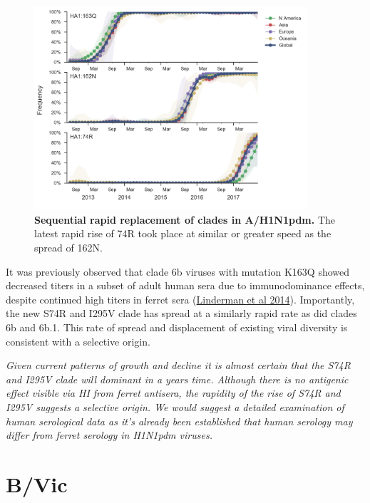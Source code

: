 \documentclass[11pt,oneside,letterpaper]{article}
\begin{document}
\begin{figure}[H]
  \centering
  \includegraphics[width=0.9\textwidth]{../figures/sep-2017/h1n1pdm_mutations_6b_6b1.png}
  \caption{\textbf{Sequential rapid replacement of clades in A/H1N1pdm.} The latest rapid rise of 74R took place at similar or greater speed as the spread of 162N.
  }
  \label{H1N1pdm_mutations}
\end{figure}
It was previously observed that clade 6b viruses with mutation K163Q
showed decreased titers in a subset of adult human sera due to
immunodominance effects, despite continued high titers in ferret sera
(\href{http://www.pnas.org/content/111/44/15798}{Linderman et al 2014}).
Importantly, the new S74R and I295V clade has spread at a similarly
rapid rate as did clades 6b and 6b.1. This rate of spread and
displacement of existing viral diversity is consistent with a selective
origin.



\emph{Given current patterns of growth and decline it is almost certain
that the S74R and I295V clade will dominant in a years time. Although
there is no antigenic effect visible via HI from ferret antisera, the
rapidity of the rise of S74R and I295V suggests a selective origin. We
would suggest a detailed examination of human serological data as it's
already been established that human serology may differ from ferret
serology in H1N1pdm viruses.}

\clearpage
\section*{B/Vic}
\end{document}

